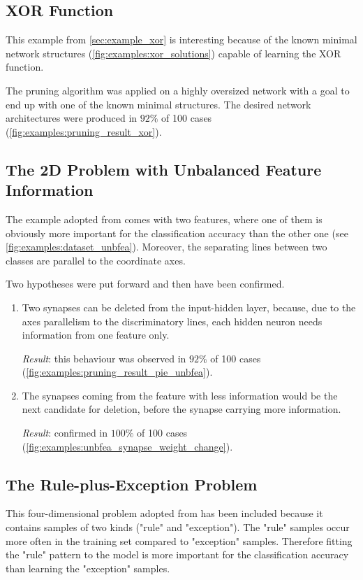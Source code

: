 \subsection*{XOR Function}
This example from \cref{sec:example_xor} is interesting because of the known minimal network structures (\cref{fig:examples:xor_solutions}) capable of learning the XOR function. 

The pruning algorithm was applied on a highly oversized network with a goal to end up with one of the known minimal structures. The desired network architectures were produced in $ 92\% $ of 100 cases (\cref{fig:examples:pruning_result_xor}).

\subsection*{The 2D Problem with Unbalanced Feature Information}
The example adopted from \citep{karnin:pa} comes with two features, where one of them is obviously more important for the classification accuracy than the other one (see \cref{fig:examples:dataset_unbfea}). Moreover, the separating lines between two classes are parallel to the coordinate axes.

Two hypotheses were put forward and then have been confirmed.

\begin{enumerate}
\item Two synapses can be deleted from the input-hidden layer, because, due to the axes parallelism to the discriminatory lines, each hidden neuron needs information from one feature only. 

\textit{Result}: this behaviour was observed in $ 92\% $ of 100 cases (\cref{fig:examples:pruning_result_pie_unbfea}).

\item  The synapses coming from the feature with less information would be the next candidate for deletion, before the synapse carrying more information.

\textit{Result}: confirmed in $ 100\% $ of 100 cases (\cref{fig:examples:unbfea_synapse_weight_change}).
\end{enumerate}

\subsection*{The Rule-plus-Exception Problem}
This four-dimensional problem adopted from \citep{mozer:skeletonization} has been included because it contains samples of two kinds ("rule" and "exception"). The "rule" samples occur more often in the training set compared to "exception" samples. Therefore fitting the "rule" pattern to the model is more important for the classification accuracy than learning the "exception" samples.


